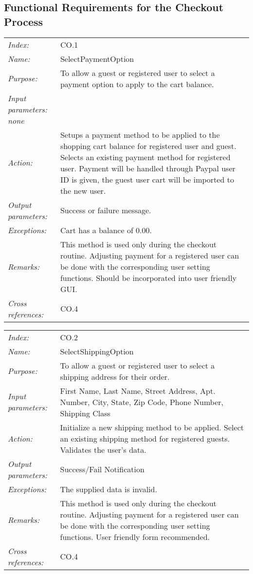 \documentclass[10pt,letter]{article}
\begin{document}
\subsection{Functional Requirements for the Checkout Process}

\begin{tabularx}{\textwidth}{l X}
    \it{Index:} & CO.1 \\
    \it{Name:} & SelectPaymentOption \\
    \it{Purpose:} & To allow a guest or registered user to select a payment option to apply to the cart balance. \\
    \it{Input parameters:} none \\
    \it{Action:} & Setups a payment method to be applied to the shopping cart balance for registered user and guest. Selects an existing payment method for registered user. Payment will be handled through Paypal
    user ID is given, the guest user cart will be imported to the new user.\\
    \it{Output parameters:} & Success or failure message. \\
    \it{Exceptions:} &  Cart has a balance of $0.00$. \\
    \it{Remarks:} & This method is used only during the checkout routine. Adjusting payment for a registered user can be done with the corresponding user setting functions. Should be incorporated into user friendly GUI.\\
    \it{Cross references:} & CO.4 \\
    \hline
\end{tabularx}

\begin{tabularx}{\textwidth}{l X}
    \it{Index:} & CO.2 \\
    \it{Name:} & SelectShippingOption \\
    \it{Purpose:} & To allow a guest or registered user to select a shipping address for their order.\\
    \it{Input parameters:} & First Name, Last Name, Street Address, Apt. Number, City, State, Zip Code, Phone Number, Shipping Class \\
    \it{Action:} & Initialize a new shipping method to be applied. Select an existing shipping method for registered guests. Validates the user's data.\\
    \it{Output parameters:} & Success/Fail Notification  \\
    \it{Exceptions:} & The supplied data is invalid. \\
    \it{Remarks:} & This method is used only during the checkout routine. Adjusting payment for a registered user can be done with the corresponding user setting functions. User friendly form recommended. \\
    \it{Cross references:} & CO.4\\
    \hline
\end{tabularx}
\end{document}
